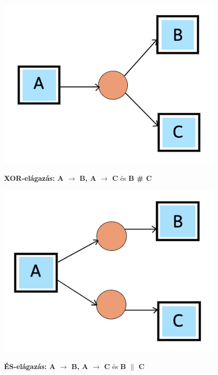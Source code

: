 \begin{figure}[h!]
\begin{center}
\caption{\textbf{XOR-elágazás: A $\rightarrow$ B, A $\rightarrow$ C} és \textbf{B \# C}}
\includegraphics[width=8truecm, height=6truecm]{images/img_alpha_xor}\\
\label{fig:example}
\end{center}
\end{figure}

\begin{figure}[h!]
\begin{center}
\caption{\textbf{ÉS-elágazás: A $\rightarrow$ B, A $\rightarrow$ C} és \textbf{B $\parallel$ C}}
\includegraphics[width=8truecm, height=6truecm]{images/img_alpha_and}\\
\label{fig:example}
\end{center}
\end{figure}

